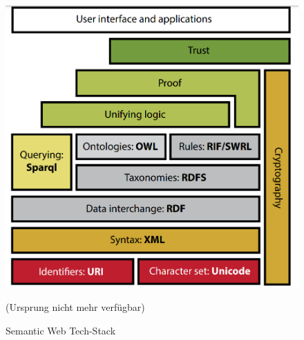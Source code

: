     \vspace{3.5cm}
    \begin{figure}[hb]
        \centering
        \includegraphics[width=.75\linewidth]{gfx/semantic_web_cake.png}
        \caption{Semantic Web Tech-Stack}
        \cite[10]{eu_cellar} (Ursprung nicht mehr verfügbar)
        \label{fig:semantic}
    \end{figure}
    